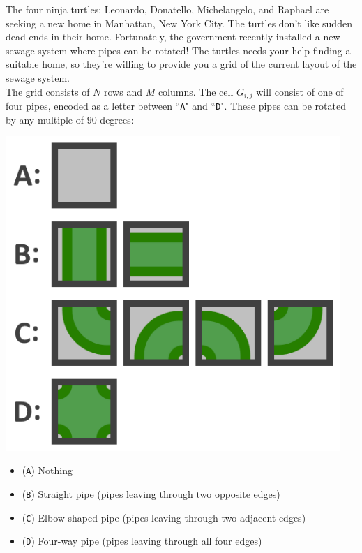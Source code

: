 
\noindent The four ninja turtles: Leonardo, Donatello, Michelangelo, and Raphael are seeking a new home in Manhattan, New York City. The turtles don't like sudden dead-ends in their home. Fortunately, the government recently installed a new sewage system where pipes can be rotated! The turtles needs your help finding a suitable home, so they're willing to provide you a grid of the current layout of the sewage system.\\

The grid consists of $N$ rows and $M$ columns. The cell $G_{i,j}$ will consist of one of four pipes, encoded as a letter between ``\texttt{A}" and ``\texttt{D}". These pipes can be rotated by any multiple of $90$ degrees:\\

\noindent
\begin{minipage}{0.25\textwidth}
  \includegraphics[width=0.95\textwidth]{pipe_rotation_1.png}
\end{minipage}
\begin{minipage}{0.75\textwidth}
  \begin{itemize}
    \item (\texttt{A}) Nothing
    \item (\texttt{B}) Straight pipe (pipes leaving through two opposite edges)
    \item (\texttt{C}) Elbow-shaped pipe (pipes leaving through two adjacent edges)
    \item (\texttt{D}) Four-way pipe (pipes leaving through all four edges)
  \end{itemize}
\end{minipage}
\vspace{10pt}

